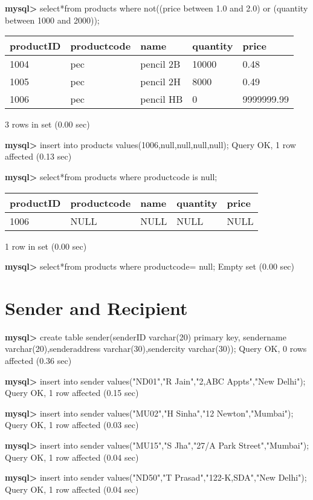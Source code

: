 \documentclass[11pt]{article}
\begin{document}
\textbf{mysql>} select*from products where not((price between 1.0 and 2.0) or (quantity between 1000 and 2000));
\begin{center}
\begin{tabular}{|l|l|l|l|l|}
\hline
productID & productcode & name & quantity & price \\
\hline
1004 & pec & pencil 2B & 10000 & 0.48 \\
1005 & pec & pencil 2H & 8000 & 0.49 \\
1006 & pec & pencil HB & 0 & 9999999.99 \\
\hline
\end{tabular}
\end{center}
3 rows in set (0.00 sec)

\textbf{mysql>} insert into products values(1006,null,null,null,null);
Query OK, 1 row affected (0.13 sec)

\textbf{mysql>} select*from products where productcode is null;
\begin{center}
\begin{tabular}{|l|l|l|l|l|}
\hline
productID & productcode & name & quantity & price \\
\hline
1006 & NULL & NULL & NULL & NULL \\
\hline
\end{tabular}
\end{center}
1 row in set (0.00 sec)

\textbf{mysql>} select*from products where productcode= null;
Empty set (0.00 sec)

\section{Sender and Recipient}
\label{sec:org07584f5}
\textbf{mysql>} create table sender(senderID varchar(20) primary key, sendername varchar(20),senderaddress varchar(30),sendercity varchar(30));
Query OK, 0 rows affected (0.36 sec)

\textbf{mysql>} insert into sender values("ND01","R Jain","2,ABC Appts","New Delhi");
Query OK, 1 row affected (0.15 sec)

\textbf{mysql>} insert into sender values("MU02","H Sinha","12 Newton","Mumbai");
Query OK, 1 row affected (0.03 sec)

\textbf{mysql>} insert into sender values("MU15","S Jha","27/A Park Street","Mumbai");
Query OK, 1 row affected (0.04 sec)

\textbf{mysql>} insert into sender values("ND50","T Prasad","122-K,SDA","New Delhi");
Query OK, 1 row affected (0.04 sec)
\end{document}
